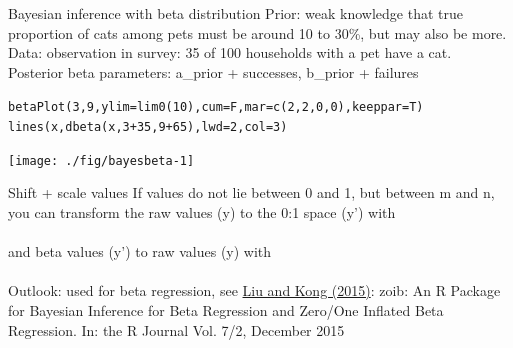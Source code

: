 \documentclass[xcolor=table,           xcolor=dvipsnames]{beamer}\usepackage[]{graphicx}\usepackage[]{color}
\makeatletter
\newcommand{\hlnum}[1]{\textcolor[rgb]{0,0,0}{#1}}
\newcommand{\hlopt}[1]{\textcolor[rgb]{0,0,0}{#1}}
\newcommand{\hlstd}[1]{\textcolor[rgb]{0,0,0}{#1}}
\newcommand{\hlkwc}[1]{\textcolor[rgb]{1,0,1}{#1}}
\newcommand{\hlkwd}[1]{\textcolor[rgb]{0,0,1}{#1}}
\newenvironment{kframe}{%
 \def\at@end@of@kframe{}%
 \ifinner\ifhmode%
  \def\at@end@of@kframe{\end{minipage}}%
  \begin{minipage}{\columnwidth}%
 \fi\fi%
 \def\FrameCommand##1{\hskip\@totalleftmargin \hskip-\fboxsep
 \colorbox{shadecolor}{##1}\hskip-\fboxsep
     \hskip-\linewidth \hskip-\@totalleftmargin \hskip\columnwidth}%
 \MakeFramed {\advance\hsize-\width
   \@totalleftmargin\z@ \linewidth\hsize
   \@setminipage}}%
 {\par\unskip\endMakeFramed%
 \at@end@of@kframe}
\newenvironment{knitrout}{}{} %
\makeatother
\begin{document}
\begin{frame}[fragile]{Bayesian inference with beta distribution}
Prior: weak knowledge that true proportion of cats among pets must be around 10 to 30\%, but may also be more.\\ \pause
Data: observation in survey: 35 of 100 households with a pet have a cat.\\ \pause
Posterior beta parameters: a\_prior + successes, b\_prior + failures \pause
\vspace{-0.8em}
\begin{knitrout}\small
{}\color{fgcolor}\begin{kframe}
\begin{alltt}
\hlkwd{betaPlot}\hlstd{(}\hlnum{3}\hlstd{,} \hlnum{9}\hlstd{,} \hlkwc{ylim}\hlstd{=}\hlkwd{lim0}\hlstd{(}\hlnum{10}\hlstd{),} \hlkwc{cum}\hlstd{=F,} \hlkwc{mar}\hlstd{=}\hlkwd{c}\hlstd{(}\hlnum{2}\hlstd{,}\hlnum{2}\hlstd{,}\hlnum{0}\hlstd{,}\hlnum{0}\hlstd{),} \hlkwc{keeppar}\hlstd{=T)}
\hlkwd{lines}\hlstd{(x,} \hlkwd{dbeta}\hlstd{(x,} \hlnum{3}\hlopt{+}\hlnum{35}\hlstd{,} \hlnum{9}\hlopt{+}\hlnum{65}\hlstd{),} \hlkwc{lwd}\hlstd{=}\hlnum{2}\hlstd{,} \hlkwc{col}\hlstd{=}\hlnum{3}\hlstd{)}
\end{alltt}
\end{kframe}

{\centering \texttt{[image: ./fig/bayesbeta-1]} 

}



\end{knitrout}
\end{frame}


\begin{frame}[fragile]{Shift + scale values}
If values do not lie between 0 and 1, but between m and n, you can transform the raw values (y) to the 0:1 space (y') with\\[1em]
~~~~~~ \\[1em]
and beta values (y') to raw values (y) with\\[1em]
~~~~~~ \\[2em]
Outlook: used for beta regression, see \href{https://journal.r-project.org/archive/2015-2/liu-kong.pdf}{Liu and Kong (2015)}: zoib: An R Package for Bayesian Inference for Beta Regression and Zero/One Inflated Beta Regression. In: the R Journal Vol. 7/2, December 2015
\end{frame}
\end{document}
